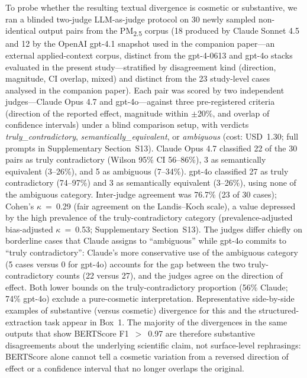 \documentclass[sn-nature]{sn-jnl}
\begin{document}
To probe whether the resulting textual divergence is cosmetic or substantive, we ran a blinded two-judge LLM-as-judge protocol on 30 newly sampled non-identical output pairs from the PM\textsubscript{2.5} corpus (18 produced by Claude Sonnet 4.5 and 12 by the OpenAI gpt-4.1 snapshot used in the companion paper---an external applied-context corpus, distinct from the gpt-4-0613 and gpt-4o stacks evaluated in the present study---stratified by disagreement kind (direction, magnitude, CI overlap, mixed) and distinct from the 23 study-level cases analysed in the companion paper).
Each pair was scored by two independent judges---Claude Opus 4.7 and gpt-4o---against three pre-registered criteria (direction of the reported effect, magnitude within $\pm$20\%, and overlap of confidence intervals) under a blind comparison setup, with verdicts \emph{truly\_contradictory}, \emph{semantically\_equivalent}, or \emph{ambiguous} (cost: USD~1.30; full prompts in Supplementary Section~S13).
Claude Opus 4.7 classified 22 of the 30 pairs as truly contradictory (Wilson 95\% CI 56--86\%), 3 as semantically equivalent (3--26\%), and 5 as ambiguous (7--34\%). gpt-4o classified 27 as truly contradictory (74--97\%) and 3 as semantically equivalent (3--26\%), using none of the ambiguous category.
Inter-judge agreement was 76.7\% (23 of 30 cases); Cohen's $\kappa$~=~0.29 (fair agreement on the Landis--Koch scale), a value depressed by the high prevalence of the truly-contradictory category (prevalence-adjusted bias-adjusted $\kappa$~=~0.53; Supplementary Section~S13). The judges differ chiefly on borderline cases that Claude assigns to ``ambiguous'' while gpt-4o commits to ``truly contradictory'': Claude's more conservative use of the ambiguous category (5 cases versus 0 for gpt-4o) accounts for the gap between the two truly-contradictory counts (22 versus 27), and the judges agree on the direction of effect.
Both lower bounds on the truly-contradictory proportion (56\% Claude; 74\% gpt-4o) exclude a pure-cosmetic interpretation. Representative side-by-side examples of substantive (versus cosmetic) divergence for this and the structured-extraction task appear in Box~1.
The majority of the divergences in the same outputs that show BERTScore F1~$>$~0.97 are therefore substantive disagreements about the underlying scientific claim, not surface-level rephrasings: BERTScore alone cannot tell a cosmetic variation from a reversed direction of effect or a confidence interval that no longer overlaps the original.
\end{document}
